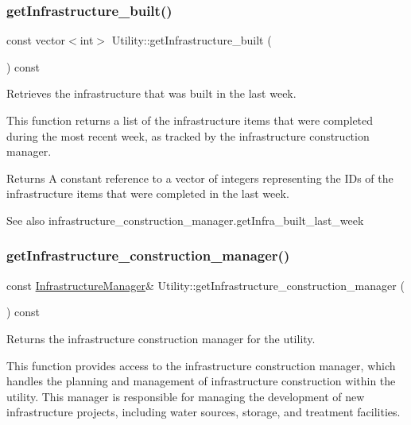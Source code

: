 \subsubsection{\texorpdfstring{get\+Infrastructure\+\_\+built()}{getInfrastructure\_built()}}
{\footnotesize\ttfamily const vector$<$int$>$ Utility\+::get\+Infrastructure\+\_\+built (\begin{DoxyParamCaption}{ }\end{DoxyParamCaption}) const}



Retrieves the infrastructure that was built in the last week. 

This function returns a list of the infrastructure items that were completed during the most recent week, as tracked by the infrastructure construction manager.

\begin{DoxyReturn}{Returns}
A constant reference to a vector of integers representing the I\+Ds of the infrastructure items that were completed in the last week.
\end{DoxyReturn}
\begin{DoxySeeAlso}{See also}
infrastructure\+\_\+construction\+\_\+manager.\+get\+Infra\+\_\+built\+\_\+last\+\_\+week 
\end{DoxySeeAlso}
\mbox{\label{classUtility_a0e8ecb5bbf910de9abecbef06c1662e6}} 
\subsubsection{\texorpdfstring{get\+Infrastructure\+\_\+construction\+\_\+manager()}{getInfrastructure\_construction\_manager()}}
{\footnotesize\ttfamily const \mbox{\hyperlink{classInfrastructureManager}{Infrastructure\+Manager}}\& Utility\+::get\+Infrastructure\+\_\+construction\+\_\+manager (\begin{DoxyParamCaption}{ }\end{DoxyParamCaption}) const}



Returns the infrastructure construction manager for the utility. 

This function provides access to the infrastructure construction manager, which handles the planning and management of infrastructure construction within the utility. This manager is responsible for managing the development of new infrastructure projects, including water sources, storage, and treatment facilities.

